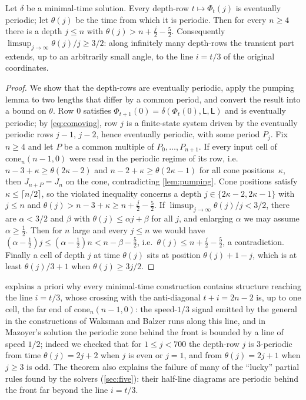 \begin{theorem}\label{thm:third}
Let $\delta$ be a minimal-time solution. Every depth-row
$t\mapsto\Phi_t(j)$ is eventually periodic; let $\theta(j)$ be the time from which
it is periodic. Then for every $n\ge4$ there is a depth $j\le n$ with
$\theta(j)>n+\tfrac{j}{2}-\tfrac52$. Consequently
$\limsup_{j\to\infty}\theta(j)/j\ge 3/2$: along infinitely many depth-rows the
transient part extends, up to an arbitrarily small angle, to the line
$i=t/3$ of the original coordinates.
\end{theorem}

\begin{proof}
We show that the depth-rows are eventually periodic, apply the pumping lemma
to two lengths that differ by a common period, and convert the result into
a bound on $\theta$. Row $0$ satisfies $\Phi_{t+1}(0)=\delta(\Phi_t(0),\mathsf L,\mathsf L)$ and is
eventually periodic; by \eqref{eq:comoving}, row $j$ is a finite-state system
driven by the eventually periodic rows $j-1$, $j-2$, hence eventually
periodic, with some period $P_j$. Fix $n\ge4$ and let $P$ be a common
multiple of $P_0,\dots,P_{n+1}$. If every input cell of
$\mathrm{cone}_n(n-1,0)$ were read in the periodic regime of its row, i.e.\
$n-3+\kappa\ge \theta(2\kappa-2)$ and $n-2+\kappa\ge \theta(2\kappa-1)$ for all cone
positions~$\kappa$, then $J_{n+P}=J_n$ on the cone, contradicting
\cref{lem:pumping}. Cone positions satisfy $\kappa\le\lceil n/2\rceil$, so
the violated inequality concerns a depth $j\in\{2\kappa-2,2\kappa-1\}$ with
$j\le n$ and $\theta(j)>n-3+\kappa\ge n+\frac{j}{2}-\frac52$.
If $\limsup_{j\to\infty}\theta(j)/j<3/2$, there are $\alpha<3/2$ and $\beta$
with $\theta(j)\le\alpha j+\beta$ for all $j$, and enlarging $\alpha$ we may
assume $\alpha\ge\tfrac12$. Then for $n$ large and every $j\le n$ we would
have $(\alpha-\tfrac12)j\le(\alpha-\tfrac12)n<n-\beta-\tfrac52$, i.e.\
$\theta(j)\le n+\tfrac j2-\tfrac52$, a contradiction. Finally a cell of depth
$j$ at time $\theta(j)$ sits at position $\theta(j)+1-j$, which is at least
$\theta(j)/3+1$ when $\theta(j)\ge 3j/2$.
\end{proof}

 explains a priori why every minimal-time construction
contains structure reaching the line $i=t/3$, whose crossing with the
anti-diagonal $t+i=2n-2$ is, up to one cell, the far end of
$\mathrm{cone}_n(n-1,0)$: the speed-$1/3$ signal emitted by the general in
the constructions of Waksman and Balzer \cite{Waksman66,Balzer67} runs along
this line, and in Mazoyer's solution the periodic zone behind the front
is bounded by a line of speed $1/2$; indeed we checked that for $1\le j<700$
the depth-row $j$ is $3$-periodic from time $\theta(j)=2j+2$ when $j$ is even or
$j=1$, and from $\theta(j)=2j+1$ when $j\ge3$ is odd. The theorem also explains the failure of many of
the ``lucky'' partial rules found by the solvers (\cref{sec:five}): their
half-line diagrams are periodic behind the front far beyond the line
$i=t/3$.

